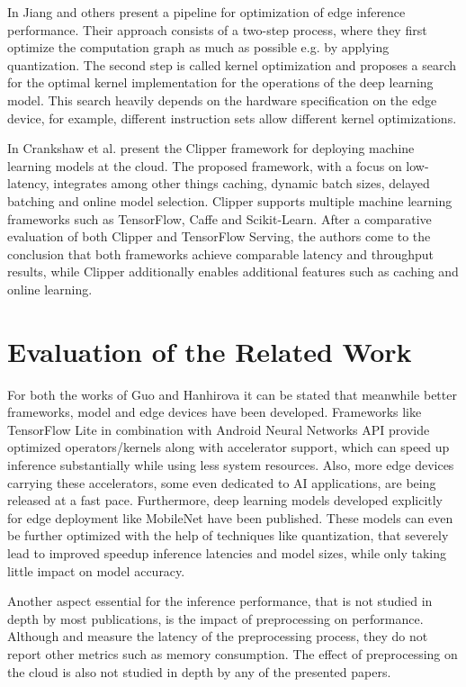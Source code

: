 In \cite{jiang2018efficient} Jiang and others present a pipeline for optimization of edge inference performance.
Their approach consists of a two-step process, where they first optimize the computation graph as much as possible e.g. by applying quantization.
The second step is called kernel optimization and proposes a search for the optimal kernel implementation for the operations of the deep learning model.
This search heavily depends on the hardware specification on the edge device, for example, different instruction sets allow different kernel optimizations.

In \cite{201468} Crankshaw et al. present the Clipper framework for deploying machine learning models at the cloud.
The proposed framework, with a focus on low-latency, integrates among other things caching, dynamic batch sizes, delayed batching and online model selection.
Clipper supports multiple machine learning frameworks such as TensorFlow, Caffe and Scikit-Learn.
After a comparative evaluation of both Clipper and TensorFlow Serving, the authors come to the conclusion that both frameworks achieve comparable latency and throughput results, while Clipper additionally enables additional features such as caching and online learning.

\section{Evaluation of the Related Work}
For both the works of Guo \cite{DBLP:conf/ic2e/Guo18} and Hanhirova \cite{DBLP:conf/mmsys/HanhirovaKSSHY18} it can be stated that meanwhile better frameworks, model and edge devices have been developed.
Frameworks like TensorFlow Lite in combination with Android Neural Networks API provide optimized operators/kernels along with accelerator support, which can speed up inference substantially while using less system resources.
Also, more edge devices carrying these accelerators, some even dedicated to AI applications, are being released at a fast pace.
Furthermore, deep learning models developed explicitly for edge deployment like MobileNet have been published. These models can even be further optimized with the help of techniques like quantization, that severely lead to improved speedup inference latencies and model sizes, while only taking little impact on model accuracy.

Another aspect essential for the inference performance, that is not studied in depth by most publications, is the impact of preprocessing on performance.
Although \cite{DBLP:conf/ic2e/Guo18} and \cite{DBLP:conf/mmsys/HanhirovaKSSHY18} measure the latency of the preprocessing process, they do not report other metrics such as memory consumption. The effect of preprocessing on the cloud is also not studied in depth by any of the presented papers.


